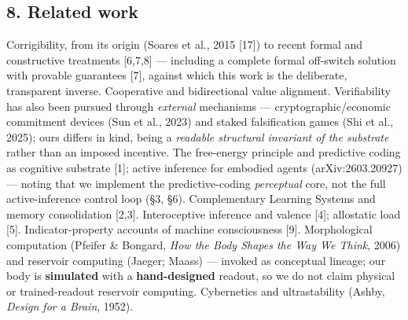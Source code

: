 \documentclass[
]{article}
\begin{document}
\subsection{8. Related work}\label{related-work}

Corrigibility, from its origin (Soares et al., 2015 {[}17{]}) to recent
formal and constructive treatments {[}6,7,8{]} --- including a complete
formal off-switch solution with provable guarantees {[}7{]}, against
which this work is the deliberate, transparent inverse. Cooperative and
bidirectional value alignment. Verifiability has also been pursued
through \emph{external} mechanisms --- cryptographic/economic commitment
devices (Sun et al., 2023) and staked falsification games (Shi et al.,
2025); ours differs in kind, being a \emph{readable structural invariant
of the substrate} rather than an imposed incentive. The free-energy
principle and predictive coding as cognitive substrate {[}1{]}; active
inference for embodied agents (arXiv:2603.20927) --- noting that we
implement the predictive-coding \emph{perceptual} core, not the full
active-inference control loop (§3, §6). Complementary Learning Systems
and memory consolidation {[}2,3{]}. Interoceptive inference and valence
{[}4{]}; allostatic load {[}5{]}. Indicator-property accounts of machine
consciousness {[}9{]}. Morphological computation (Pfeifer \& Bongard,
\emph{How the Body Shapes the Way We Think}, 2006) and reservoir
computing (Jaeger; Maass) --- invoked as conceptual lineage; our body is
\textbf{simulated} with a \textbf{hand-designed} readout, so we do not
claim physical or trained-readout reservoir computing. Cybernetics and
ultrastability (Ashby, \emph{Design for a Brain}, 1952).
\end{document}
